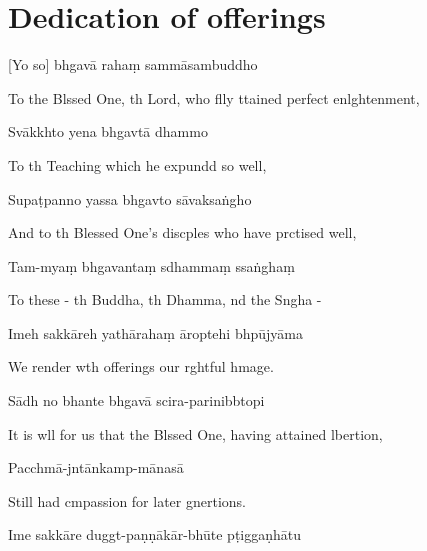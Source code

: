 \chapter{Dedication of offerings}

[Yo so] bhgavā rahaṃ sammāsambuddho

\begin{english}
To the Blssed One, th Lord, who flly ttained perfect enlghtenment,
\end{english}

Svākkhto yena bhgavtā dhammo

\begin{english}
To th Teaching which he expundd so well,
\end{english}

Supaṭpanno yassa bhgavto sāvaksaṅgho

\begin{english}
And to th Blessed One's discples who have prctised well,
\end{english}

Tam-myaṃ bhgavantaṃ sdhammaṃ ssaṅghaṃ

\begin{english}
To these - th Buddha, th Dhamma, nd the Sngha -
\end{english}

Imeh sakkāreh yathārahaṃ āroptehi bhpūjyāma

\begin{english}
We render wth offerings our rghtful hmage.
\end{english}

Sādh no bhante bhgavā scira-parinibbtopi

\begin{english}
It is wll for us that the Blssed One, having attained lbertion,
\end{english}

Pacchmā-jntānkamp-mānasā

\begin{english}
Still had cmpassion for later gnertions.
\end{english}

Ime sakkāre duggt-paṇṇākār-bhūte pṭiggaṇhātu

